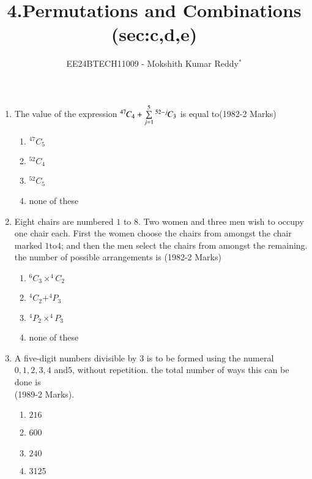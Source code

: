 \documentclass[journal,12pt,twocolumn]{IEEEtran}
\theoremstyle{remark}
\begin{document}

\vspace{3cm}

\title{4.Permutations and Combinations (sec:c,d,e)}
\author{EE24BTECH11009 - Mokshith Kumar Reddy$^{*}$%
}
\maketitle
\newpage
\bigskip
\begin{enumerate}[start=3]
\item  The value of the expression ${{}^{47}\mkern-1muC_{4}}+\sum\limits_{j=1}^{5} {{}^{52-j}\mkern-1muC_{3}}$ is equal to\hfill{(1982-2 Marks)}\\
\begin{multicols}{2} 
\begin{enumerate}
\item $^{47}C_5$
\item$^{52}C_4$
\columnbreak
\item $^{52}C_5$
\item none of these\\
\end{enumerate}
\end{multicols}
\item Eight chairs are numbered $1$ to $8$. Two women and three men wish to occupy one chair each. First the women choose the chairs from amongst the chair marked $1$to$4$; and then the men select the chairs from amongst the remaining. the number of possible arrangements is
\hfill{(1982-2 Marks)}\\
\begin{multicols}{2} 
\begin{enumerate}
\item $^6C_3\times^4C_2$
\item $^4C_2+^4P_3$\columnbreak
\item $^4P_2\times^4P_3$
\item none of these\\[4pt]
\end{enumerate}
\end{multicols}
\item A five-digit numbers divisible by $3$ is to be formed using the numeral $0,1,2,3,4$ and$ 5$, without repetition. the total number of ways this can be done is\\
\hspace*{\fill}(1989-2 Marks).
\begin{multicols}{2} 
\begin{enumerate}
\item $216$\item  600\columnbreak\item $240$\item 3125\\

\end{enumerate}
\end{multicols}
\end{enumerate}
\end{document}

